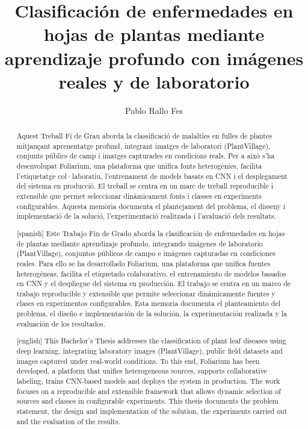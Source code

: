 \documentclass[11pt,spanish,listoffigures,listoftables]{tfgetsinf}
\title{Clasificación de enfermedades en hojas de plantas mediante aprendizaje profundo con imágenes reales y de laboratorio}
\author{Pablo Rallo Fes}
\begin{document}
\begin{abstract}
Aquest Treball Fi de Grau aborda la classificació de malalties en fulles de plantes mitjançant aprenentatge profund, integrant imatges de laboratori (PlantVillage), conjunts públics de camp i imatges capturades en condicions reals. Per a això s'ha desenvolupat Foliarium, una plataforma que unifica fonts heterogènies, facilita l'etiquetatge col·laboratiu, l'entrenament de models basats en CNN i el desplegament del sistema en producció. El treball se centra en un marc de treball reproducible i extensible que permet seleccionar dinàmicament fonts i classes en experiments configurables. Aquesta memòria documenta el plantejament del problema, el disseny i implementació de la solució, l'experimentació realitzada i l'avaluació dels resultats.
\end{abstract}

\begin{abstract}[spanish]
Este Trabajo Fin de Grado aborda la clasificación de enfermedades en hojas de plantas mediante aprendizaje profundo, integrando imágenes de laboratorio (PlantVillage), conjuntos públicos de campo e imágenes capturadas en condiciones reales. Para ello se ha desarrollado Foliarium, una plataforma que unifica fuentes heterogéneas, facilita el etiquetado colaborativo, el entrenamiento de modelos basados en CNN y el despliegue del sistema en producción. El trabajo se centra en un marco de trabajo reproducible y extensible que permite seleccionar dinámicamente fuentes y clases en experimentos configurables. Esta memoria documenta el planteamiento del problema, el diseño e implementación de la solución, la experimentación realizada y la evaluación de los resultados.
\end{abstract}

\begin{abstract}[english]
This Bachelor's Thesis addresses the classification of plant leaf diseases using deep learning, integrating laboratory images (PlantVillage), public field datasets and images captured under real-world conditions. To this end, Foliarium has been developed, a platform that unifies heterogeneous sources, supports collaborative labeling, trains CNN-based models and deploys the system in production. The work focuses on a reproducible and extensible framework that allows dynamic selection of sources and classes in configurable experiments. This thesis documents the problem statement, the design and implementation of the solution, the experiments carried out and the evaluation of the results.
\end{abstract}
\end{document}
